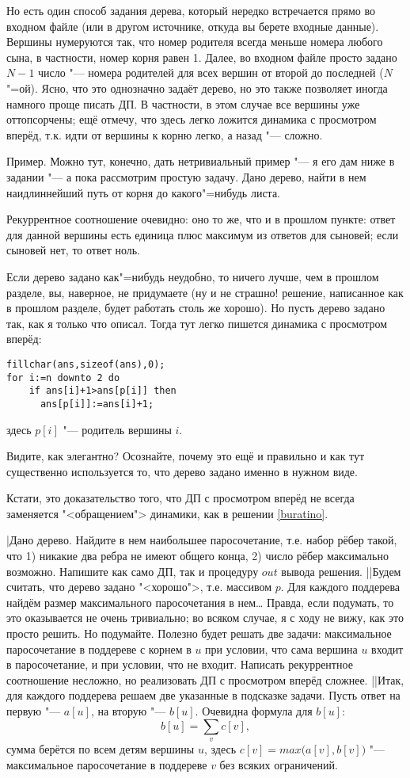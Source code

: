 Но есть один способ задания дерева, который нередко встречается прямо во входном файле (или в другом
источнике, откуда вы берете входные данные). Вершины нумеруются так, что номер родителя всегда
меньше номера любого сына, в частности, номер корня равен 1. Далее, во входном файле просто задано
$N-1$ число "--- номера родителей для всех вершин от второй до последней ($N$"=ой). Ясно, что это
однозначно задаёт дерево, но это также позволяет иногда намного проще писать ДП. В частности, в этом
случае все вершины уже оттопсорчены; ещё отмечу, что здесь легко ложится динамика с просмотром
вперёд, т.к. идти от вершины к корню легко, а назад "--- сложно.

Пример. Можно тут, конечно, дать нетривиальный пример "--- я его дам ниже в задании "--- а пока
рассмотрим простую задачу. Дано дерево, найти в нем наидлиннейший путь от корня до какого"=нибудь
листа.

Рекуррентное соотношение очевидно: оно то же, что и в прошлом пункте: ответ для данной вершины есть
единица плюс максимум из ответов для сыновей; если сыновей нет, то ответ ноль.

Если дерево задано как"=нибудь неудобно, то ничего лучше, чем в прошлом разделе, вы, наверное, не
придумаете (ну и не страшно! решение, написанное как в прошлом разделе, будет работать столь же
хорошо). Но пусть дерево задано так, как я только что описал. Тогда тут легко пишется динамика с
просмотром вперёд:
\begin{codesampleo}\begin{verbatim}
fillchar(ans,sizeof(ans),0);
for i:=n downto 2 do
    if ans[i]+1>ans[p[i]] then
      ans[p[i]]:=ans[i]+1;
\end{verbatim}
\end{codesampleo}
здесь $p[i]$ "--- родитель вершины $i$.

Видите, как элегантно? Осознайте, почему это ещё и правильно и как тут существенно используется то,
что дерево задано именно в нужном виде.

Кстати, это доказательство того, что ДП с просмотром вперёд не всегда заменяется "<обращением"> 
динамики, как в решении \ref{buratino}.

\task|Дано дерево. Найдите в нем наибольшее паросочетание, т.е. набор рёбер такой, что 1) никакие
два ребра не имеют общего конца, 2) число рёбер максимально возможно. Напишите как само ДП, так и 
процедуру $out$ вывода решения.
||Будем считать, что дерево задано "<хорошо">, т.е. массивом $p$. Для каждого 
поддерева найдём размер максимального паросочетания в нем\dots{} Правда, если подумать, то это 
оказывается не очень тривиально; во всяком случае, я с ходу не вижу, как это просто решить. Но 
подумайте. Полезно будет решать две задачи: максимальное паросочетание в поддереве с корнем в $u$ 
при условии, что сама вершина $u$ входит в паросочетание, и при условии, что не входит. Написать 
рекуррентное соотношение несложно, но реализовать ДП с просмотром вперёд сложнее.
||Итак, для каждого поддерева решаем две указанные в подсказке задачи. Пусть ответ на первую "--- 
$a[u]$, на вторую "--- $b[u]$. Очевидна формула для $b[u]$:
$$
b[u]=\sum_v c[v],
$$
сумма берётся по всем детям вершины $u$, здесь 
$c[v]=max\big(a[v],b[v]\big)$ "--- максимальное паросочетание в поддереве $v$ без всяких ограничений. 

